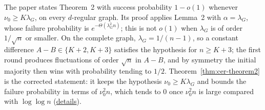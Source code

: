 \begin{remark}\label{rem:cer-correction}
The paper states Theorem~2 with success probability $1-o(1)$ whenever $\nu_0\ge K\lambda_G$, on
every $d$-regular graph. Its proof applies Lemma~2 with $\alpha=\lambda_G$, whose failure
probability is $e^{-\Theta(\lambda_G^2n)}$; this is not $o(1)$ when $\lambda_G$ is of order
$1/\sqrt n$ or smaller. On the complete graph, $\lambda_G=1/(n-1)$, so a constant difference
$A-B\in\{K+2,K+3\}$ satisfies the hypothesis for $n\ge K+3$; the first round produces
fluctuations of order $\sqrt n$ in $A-B$, and by symmetry the initial majority then wins with
probability tending to $1/2$. Theorem~\ref{thm:cer-theorem2} is the corrected statement: it keeps
the hypothesis $\nu_0\ge K\lambda_G$ and bounds the failure probability in terms of $\nu_0^2n$,
which tends to $0$ once $\nu_0^2n$ is large compared with $\log\log n$
(\href{https://github.com/formal-dynamics/leanamics/blob/main/median/FORMALIZATION_DIFFERENCES.md#theorem-2-of-the-paper-needs-a-major-correction}{details}).
\end{remark}

